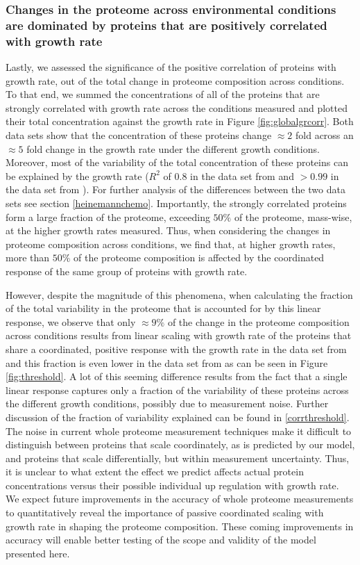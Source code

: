 \documentclass[a4paper]{article}
\begin{document}
\subsubsection{Changes in the proteome across environmental conditions are dominated by proteins that are positively correlated with growth rate}
Lastly, we assessed the significance of the positive correlation of proteins with growth rate, out of the total change in proteome composition across conditions.
To that end, we summed the concentrations of all of the proteins that are strongly correlated with growth rate across the conditions measured and plotted their total concentration against the growth rate in Figure \ref{fig:globalgrcorr}.
Both data sets show that the concentration of these proteins change $\approx 2$ fold across an $\approx 5$ fold change in the growth rate under the different growth conditions.
Moreover, most of the variability of the total concentration of these proteins can be explained by the growth rate ($R^2$ of $0.8$ in the data set from \cite{Heinemann2015} and $>0.99$ in the data set from \cite{Valgepea2013}). 
For further analysis of the differences between the two data sets see section \ref{heinemannchemo}.
Importantly, the strongly correlated proteins form a large fraction of the proteome, exceeding $50\%$ of the proteome, mass-wise, at the higher growth rates measured.
Thus, when considering the changes in proteome composition across conditions, we find that, at higher growth rates, more than $50\%$ of the proteome composition is affected by the coordinated response of the same group of proteins with growth rate.

However, despite the magnitude of this phenomena, when calculating the fraction of the total variability in the proteome that is accounted for by this linear response, we observe that only $\approx 9\%$ of the change in the proteome composition across conditions results from linear scaling with growth rate of the proteins that share a coordinated, positive response with the growth rate in the data set from \cite{Heinemann2015} and this fraction is even lower in the data set from \cite{Valgepea2013} as can be seen in Figure \ref{fig:threshold}.
A lot of this seeming difference results from the fact that a single linear response captures only a fraction of the variability of these proteins across the different growth conditions, possibly due to measurement noise.
Further discussion of the fraction of variability explained can be found in \ref{corrthreshold}.
The noise in current whole proteome measurement techniques make it difficult to distinguish between proteins that scale coordinately, as is predicted by our model, and proteins that scale differentially, but within measurement uncertainty.
Thus, it is unclear to what extent the effect we predict affects actual protein concentrations versus their possible individual up regulation with growth rate.
We expect future improvements in the accuracy of whole proteome measurements to quantitatively reveal the importance of passive coordinated scaling with growth rate in shaping the proteome composition. These coming improvements in accuracy will enable better testing of the scope and validity of the model presented here.
\end{document}
